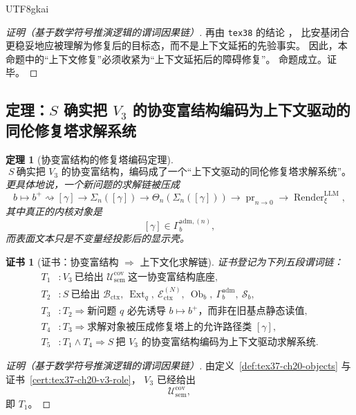 \documentclass[12pt]{article}
\newtheorem{theorem}{定理}[section]
\newtheorem{Certificate}{证书}[section]
\newcommand{\Render}{\operatorname{Render}}
\begin{document}
\begin{CJK*}{UTF8}{gkai}
\begin{proof}[证明（基于数学符号推演逻辑的谓词因果链）]
再由 \texttt{tex38} 的结论 \cite{RepoTex38JacobiBianchiRepair}，
比安基闭合更稳妥地应被理解为修复后的目标态，而不是上下文延拓的先验事实。
因此，本命题中的“上下文修复”必须收紧为“上下文延拓后的障碍修复”。
命题成立。证毕。
\end{proof}

\subsection{定理：\texorpdfstring{$S$}{S} 确实把 \texorpdfstring{$V_3$}{V3} 的协变富结构编码为上下文驱动的同伦修复塔求解系统}
\label{subsec:tex37-ch20-theorem}

\begin{theorem}[协变富结构的修复塔编码定理]
\label{thm:tex37-ch20-encoded-solver}
\[
  \boxed{
    S\ \text{确实把 }V_3\text{ 的协变富结构，编码成了一个“上下文驱动的同伦修复塔求解系统”。}
  }
\]
更具体地说，一个新问题的求解链被压成
\[
  b
  \mapsto
  b^+
  \rightsquigarrow
  [\gamma]
  \to
  \Sigma_n([\gamma])
  \to
  \Theta_n(\Sigma_n([\gamma]))
  \to
  \operatorname{pr}_{n\to 0}
  \to
  \Render^{\mathrm{LLM}}_\xi,
\]
其中真正的内核对象是
\[
  [\gamma]\in \Gamma_b^{\mathrm{adm},(n)},
\]
而表面文本只是不变量经投影后的显示壳。
\end{theorem}

\begin{Certificate}[证书：协变富结构 $\Rightarrow$ 上下文化求解链]
\label{cert:tex37-ch20-encoded-solver}
证书登记为下列五段谓词链：
\[
\begin{aligned}
  T_1 &: V_3\ \text{已给出 }\mathcal U_{\mathrm{sem}}^{\mathrm{cov}}\ \text{这一协变富结构底座},\\
  T_2 &: S\ \text{已给出 }\mathcal B_{\mathrm{ctx}},\ \operatorname{Ext}_q,\ \mathcal E_{\mathrm{ctx}}^{(N)},\
    \operatorname{Ob}_b,\ \Gamma_b^{\mathrm{adm}},\ \mathcal S_b,\\
  T_3 &: T_2\Rightarrow \text{新问题 }q\text{ 必先诱导 }b\mapsto b^+\text{，而非在旧基点静态读值},\\
  T_4 &: T_3\Rightarrow \text{求解对象被压成修复塔上的允许路径类 }[\gamma],\\
  T_5 &: T_1\wedge T_4\Rightarrow S\ \text{把 }V_3\text{ 的协变富结构编码为上下文驱动求解系统}.
\end{aligned}
\]
\end{Certificate}

\begin{proof}[证明（基于数学符号推演逻辑的谓词因果链）]
由定义~\ref{def:tex37-ch20-objects} 与证书~\ref{cert:tex37-ch20-v3-role}，
$V_3$ 已经给出
\[
  \mathcal U_{\mathrm{sem}}^{\mathrm{cov}},
\]
即 $T_1$。


\end{proof}
\end{CJK*}
\end{document}
